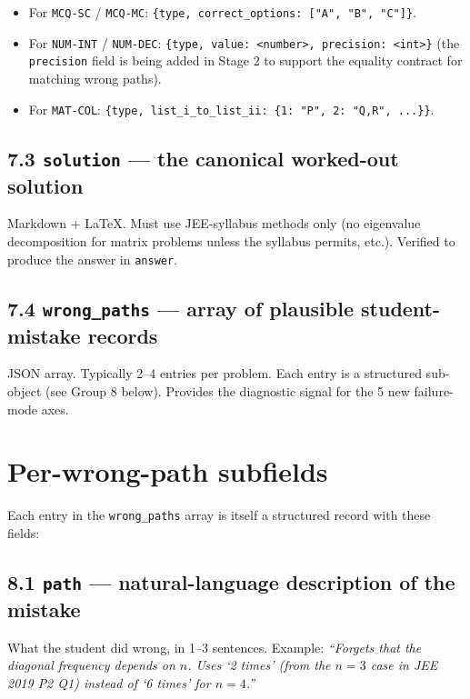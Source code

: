 \documentclass[11pt,letterpaper]{article}
\newcommand{\cd}[1]{\texttt{\small #1}}
\begin{document}
\begin{itemize}\itemsep0em
\item For \cd{MCQ-SC} / \cd{MCQ-MC}: \cd{\{type, correct\_options: ["A", "B", "C"]\}}.
\item For \cd{NUM-INT} / \cd{NUM-DEC}: \cd{\{type, value: <number>, precision: <int>\}} (the \cd{precision} field is being added in Stage 2 to support the equality contract for matching wrong paths).
\item For \cd{MAT-COL}: \cd{\{type, list\_i\_to\_list\_ii: \{1: "P", 2: "Q,R", ...\}\}}.
\end{itemize}

\subsection*{7.3 \cd{solution} --- the canonical worked-out solution}

Markdown + LaTeX. Must use JEE-syllabus methods only (no eigenvalue decomposition for matrix problems unless the syllabus permits, etc.). Verified to produce the answer in \cd{answer}.

\subsection*{7.4 \cd{wrong\_paths} --- array of plausible student-mistake records}

JSON array. Typically 2--4 entries per problem. Each entry is a structured sub-object (see Group 8 below). Provides the diagnostic signal for the 5 new failure-mode axes.

\newpage
\section{Per-wrong-path subfields}\label{sec:wrongpath}

Each entry in the \cd{wrong\_paths} array is itself a structured record with these fields:

\subsection*{8.1 \cd{path} --- natural-language description of the mistake}

What the student did wrong, in 1--3 sentences. Example: \emph{``Forgets that the diagonal frequency depends on $n$. Uses `2 times' (from the $n=3$ case in JEE 2019 P2 Q1) instead of `6 times' for $n=4$.''}
\end{document}
